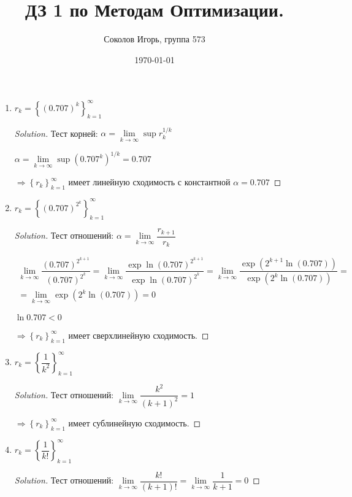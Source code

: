 \documentclass[a4paper,12pt]{article}
\author{Соколов Игорь, группа 573}
\title{ДЗ 1 по Методам Оптимизации.}
\date{\today}
\newenvironment{solution}
{\renewcommand\qedsymbol{$\blacksquare$}\begin{proof}[Solution]}{\end{proof}}
\newcommand{\lt}{\left}
\newcommand{\rt}{\right}
\newcommand{\al}{\alpha}
\newcommand{\dfr}{\dfrac}
\newcommand{\rw}{\rightarrow}
\newcommand{\iy}{\infty}
\newcommand{\Rw}{\Rightarrow}
\begin{document}

\maketitle

\begin{enumerate}
\item $r_k = \lt\{\lt(0.707\rt)^k\rt\}_{k=1}^{\infty}$
\begin{solution}
	Тест корней:
	$\al =  \lim\limits_{k \rw \infty}\sup r_k^{1/k}$
	
	$\al = \lim\limits_{k \rw \infty}\sup \lt(0.707^k\rt)^{1/k} = 0.707$
	
	$\Rw \left\{ r_k\right\}_{k=1}^{\iy}$ имеет линейную сходимость с константной $\al = 0.707$
	
\end{solution}

\item $r_k =
 \lt\{\lt(0.707\rt)^{2^k}\rt\}_{k=1}^{\infty}$
\begin{solution}
	Тест отношений:
	$\al = \lim\limits_{k \rw \infty} \dfrac{r_{k+1}}{r_k}$
	
	\begin{multline}
		\lim\limits_{k \rw \infty} \dfrac{\lt(0.707\rt)^{2^{k+1}}}{\lt(0.707\rt)^{2^k}} =\lim\limits_{k \rw \infty} \dfr{\exp\ln\lt(0.707\rt)^{2^{k+1}}}{\exp\ln\lt(0.707\rt)^{2^{k}}} =\lim\limits_{k \rw \infty} \dfr{\exp(2^{k+1}\ln(0.707))}{\exp(2^{k}\ln(0.707))} =\\= \lim\limits_{k \rw \infty} \exp (2^k \ln(0.707)) = 0
	\end{multline}
	
	$\ln 0.707 < 0$ 
	
	$\Rw \left\{ r_k\right\}_{k=1}^{\iy}$ имеет сверхлинейную сходимость.
	
\end{solution}

\item
 $r_k = \lt\{\dfr{1}{k^2}\rt\}_{k=1}^{\infty}$
 \begin{solution}
 Тест отношений:
 $\lim\limits_{k \rw \infty} \dfrac{k^2}{(k+1)^2} = 1$
 
 $\Rw \left\{ r_k\right\}_{k=1}^{\iy}$ имеет сублинейную сходимость.
 \end{solution}

\item $r_k = \lt\{\dfr{1}{k!}\rt\}_{k=1}^{\infty}$
\begin{solution}
Тест отношений:
$\lim\limits_{k \rw \infty} \dfrac{k!}{(k+1)!} = \lim\limits_{k \rw \infty}\dfr{1}{k+1} = 0$


\end{solution}
\end{enumerate}
\end{document}
